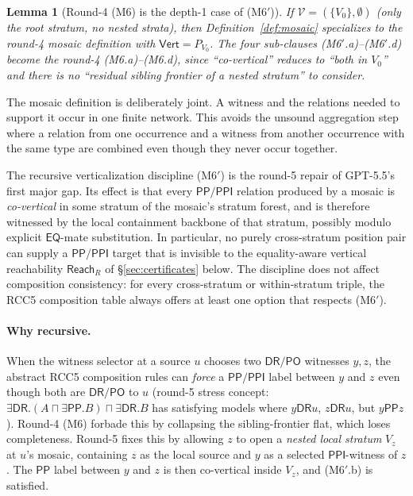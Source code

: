 \documentclass[11pt]{article}
\newtheorem{lemma}[theorem]{Lemma}
\newcommand{\EQ}{\mathsf{EQ}}
\newcommand{\DR}{\mathsf{DR}}
\newcommand{\PO}{\mathsf{PO}}
\newcommand{\PP}{\mathsf{PP}}
\newcommand{\PPI}{\mathsf{PPI}}
\newcommand{\Reach}{\mathrel{\mathsf{Reach}}}
\newcommand{\Vrt}{\mathsf{Vert}}
\begin{document}
\begin{lemma}[Round-4 (M6) is the depth-1 case of (M6$'$)]
\label{lem:round4-recovery}
If $\mathcal V=(\{V_0\},\emptyset)$ (only the root stratum, no
nested strata), then Definition~\ref{def:mosaic} specializes to the
round-4 mosaic definition with $\Vrt=P_{V_0}$.  The four sub-clauses
(M6$'$.a)--(M6$'$.d) become the round-4 (M6.a)--(M6.d), since
``co-vertical'' reduces to ``both in $V_0$'' and there is no
``residual sibling frontier of a nested stratum'' to consider.
\end{lemma}

The mosaic definition is deliberately joint.  A witness and the relations needed to support it occur in one finite network.  This avoids the unsound aggregation step where a relation from one occurrence and a witness from another occurrence with the same type are combined even though they never occur together.

The recursive verticalization discipline (M6$'$) is the round-5
repair of GPT-5.5's first major gap.  Its effect is that every
$\PP/\PPI$ relation produced by a mosaic is \emph{co-vertical} in
some stratum of the mosaic's stratum forest, and is therefore
witnessed by the local containment backbone of that stratum,
possibly modulo explicit $\EQ$-mate substitution.  In particular, no
purely cross-stratum position pair can supply a $\PP/\PPI$ target
that is invisible to the equality-aware vertical reachability
$\Reach_R$ of \S\ref{sec:certificates} below.  The discipline does
not affect composition consistency: for every cross-stratum or
within-stratum triple, the RCC5 composition table always offers at
least one option that respects (M6$'$).

\paragraph{Why recursive.}  When the witness selector at a source
$u$ chooses two $\DR/\PO$ witnesses $y,z$, the abstract RCC5
composition rules can \emph{force} a $\PP/\PPI$ label between $y$
and $z$ even though both are $\DR/\PO$ to $u$ (round-5 stress
concept: $\exists\DR.(A\sqcap\exists\PP.B)\sqcap\exists\DR.B$ has
satisfying models where $y\DR u$, $z\DR u$, but $y\PP z$).  Round-4
(M6) forbade this by collapsing the sibling-frontier flat, which
loses completeness.  Round-5 fixes this by allowing $z$ to open a
\emph{nested local stratum} $V_z$ at $u$'s mosaic, containing $z$ as
the local source and $y$ as a selected $\PPI$-witness of $z$.  The
$\PP$ label between $y$ and $z$ is then co-vertical inside $V_z$,
and (M6$'$.b) is satisfied.
\end{document}

